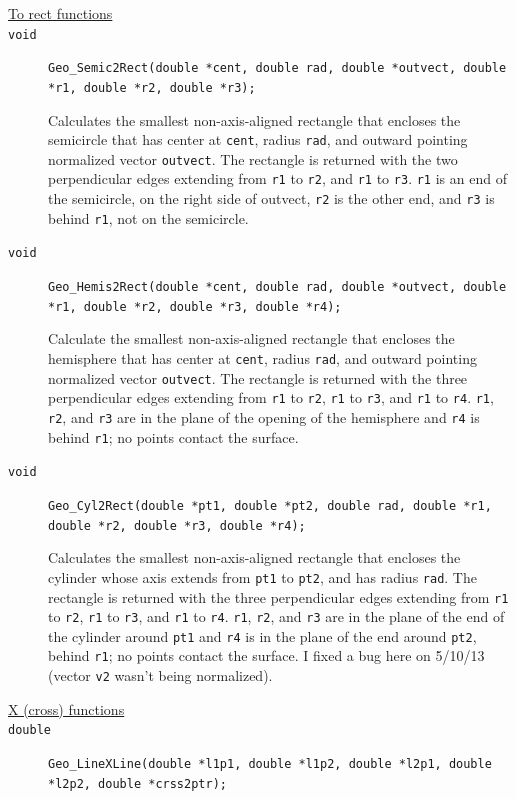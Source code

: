 \documentclass[11pt]{article}
\newcommand {\ttt} {\texttt}
\begin{document}
\begin{description}
\item[\underline{To rect functions}]

\item[\ttt{void}]
\ttt{Geo\_Semic2Rect(double *cent, double rad, double *outvect, double *r1, double *r2, double *r3);}

Calculates the smallest non-axis-aligned rectangle that encloses the semicircle that has center at \ttt{cent}, radius \ttt{rad}, and outward pointing normalized vector \ttt{outvect}. The rectangle is returned with the two perpendicular edges extending from \ttt{r1} to \ttt{r2}, and \ttt{r1} to \ttt{r3}. \ttt{r1} is an end of the semicircle, on the right side of outvect, \ttt{r2} is the other end, and \ttt{r3} is behind \ttt{r1}, not on the semicircle.

\item[\ttt{void}]
\ttt{Geo\_Hemis2Rect(double *cent, double rad, double *outvect, double *r1, double *r2, double *r3, double *r4);}

Calculate the smallest non-axis-aligned rectangle that encloses the hemisphere that has center at \ttt{cent}, radius \ttt{rad}, and outward pointing normalized vector \ttt{outvect}. The rectangle is returned with the three perpendicular edges extending from \ttt{r1} to \ttt{r2}, \ttt{r1} to \ttt{r3}, and \ttt{r1} to \ttt{r4}. \ttt{r1}, \ttt{r2}, and \ttt{r3} are in the plane of the opening of the hemisphere and \ttt{r4} is behind \ttt{r1}; no points contact the surface.

\item[\ttt{void}]
\ttt{Geo\_Cyl2Rect(double *pt1, double *pt2, double rad, double *r1, double *r2, double *r3, double *r4);}

Calculates the smallest non-axis-aligned rectangle that encloses the cylinder whose axis extends from \ttt{pt1} to \ttt{pt2}, and has radius \ttt{rad}. The rectangle is returned with the three perpendicular edges extending from \ttt{r1} to \ttt{r2}, \ttt{r1} to \ttt{r3}, and \ttt{r1} to \ttt{r4}. \ttt{r1}, \ttt{r2}, and \ttt{r3} are in the plane of the end of the cylinder around \ttt{pt1} and \ttt{r4} is in the plane of the end around \ttt{pt2}, behind \ttt{r1}; no points contact the surface. I fixed a bug here on 5/10/13 (vector \ttt{v2} wasn't being normalized).

\item[\underline{X (cross) functions}]

\item[\ttt{double}]
\ttt{Geo\_LineXLine(double *l1p1, double *l1p2, double *l2p1, double *l2p2, double *crss2ptr);}


\end{description}
\end{document}
